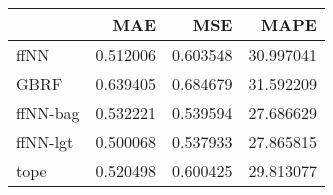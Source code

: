 \begin{tabular}{lrrr}
\toprule
{} &       MAE &       MSE &       MAPE \\
\midrule
ffNN     &  0.512006 &  0.603548 &  30.997041 \\
GBRF     &  0.639405 &  0.684679 &  31.592209 \\
ffNN-bag &  0.532221 &  0.539594 &  27.686629 \\
ffNN-lgt &  0.500068 &  0.537933 &  27.865815 \\
tope     &  0.520498 &  0.600425 &  29.813077 \\
\bottomrule
\end{tabular}
